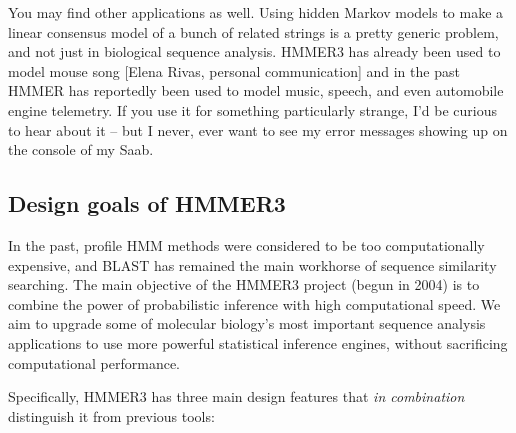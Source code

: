 You may find other applications as well. Using hidden Markov models to
make a linear consensus model of a bunch of related strings is a
pretty generic problem, and not just in biological sequence analysis.
HMMER3 has already been used to model mouse song [Elena Rivas,
  personal communication] and in the past HMMER has reportedly been
used to model music, speech, and even automobile engine telemetry. If
you use it for something particularly strange, I'd be curious to hear
about it -- but I never, ever want to see my error messages showing up
on the console of my Saab.



\subsection{Design goals of HMMER3}

In the past, profile HMM methods were considered to be too
computationally expensive, and BLAST has remained the main workhorse
of sequence similarity searching. The main objective of the HMMER3
project (begun in 2004) is to combine the power of probabilistic
inference with high computational speed. We aim to upgrade some of
molecular biology's most important sequence analysis applications to
use more powerful statistical inference engines, without sacrificing
computational performance.

Specifically, HMMER3 has three main design features that \emph{in
combination} distinguish it from previous tools:


